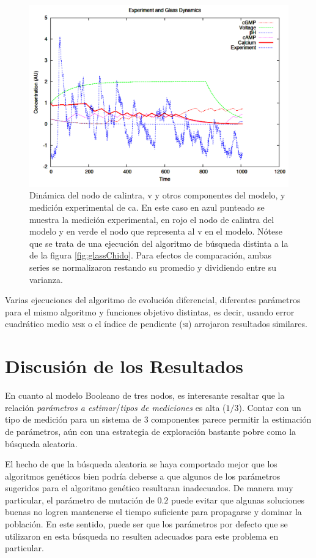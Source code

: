 \begin{figure}[h]
\includegraphics[width=0.9\linewidth]{gfx/glassChafa}
\caption[Dinámica de \ac{calintra}, \ac{v} y otros componentes del modelo, y medición experimental de \ac{ca}]{Dinámica del nodo de \ac{calintra}, \ac{v} y otros componentes del modelo, y medición experimental de \ac{ca}. En este caso en azul punteado se muestra la medición experimental, en rojo el nodo de \ac{calintra} del modelo y en verde el nodo que representa al \acf{v} en el modelo. Nótese que se trata de una ejecución del algoritmo de búsqueda distinta a la de la figura \ref{fig:glassChido}. Para efectos de comparación, ambas series se normalizaron restando su promedio y dividiendo entre su varianza.}\label{fig:glassChafa}
\end{figure}

Varias ejecuciones del algoritmo de evolución diferencial, diferentes parámetros para el mismo algoritmo y funciones objetivo distintas, es decir, usando error cuadrático medio \textsc{mse} o el índice de pendiente \textsc{(si)} arrojaron resultados similares.


\section{Discusión de los Resultados}

En cuanto al modelo Booleano de tres nodos, es interesante resaltar que la relación \emph{parámetros a estimar}/\emph{tipos de mediciones} es alta ($1/3$). Contar con un tipo de medición para un sistema de 3 componentes parece permitir la estimación de parámetros, aún con una estrategia de exploración bastante pobre como la búsqueda aleatoria.

El hecho de que la búsqueda aleatoria se haya comportado mejor que los algoritmos genéticos bien podría deberse a que algunos de los parámetros sugeridos para el algoritmo genético resultaran inadecuados. De manera muy particular, el parámetro de mutación de $0.2$ puede evitar que algunas soluciones buenas no logren mantenerse el tiempo suficiente para propagarse y dominar la población. En este sentido, puede ser que los parámetros por defecto que se utilizaron en esta búsqueda no resulten adecuados para este problema en particular.

